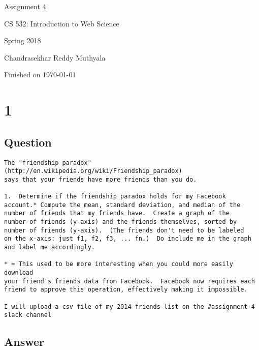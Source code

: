 \documentclass[letterpaper,11pt]{article}
\begin{document}
\begin{titlepage}

\begin{center}

\Huge{Assignment 4}

\Large{CS 532:  Introduction to Web Science}

\Large{Spring 2018}

\Large{Chandrasekhar Reddy Muthyala}

\Large Finished on \today

\end{center}

\end{titlepage}

\newpage


\section*{1}


\subsection*{Question}


\begin{justify}
\begin{verbatim}
The "friendship paradox" (http://en.wikipedia.org/wiki/Friendship_paradox)
says that your friends have more friends than you do.  

1.  Determine if the friendship paradox holds for my Facebook
account.* Compute the mean, standard deviation, and median of the
number of friends that my friends have.  Create a graph of the
number of friends (y-axis) and the friends themselves, sorted by
number of friends (y-axis).  (The friends don't need to be labeled
on the x-axis: just f1, f2, f3, ... fn.)  Do include me in the graph
and label me accordingly.

* = This used to be more interesting when you could more easily download
your friend's friends data from Facebook.  Facebook now requires each
friend to approve this operation, effectively making it impossible.

I will upload a csv file of my 2014 friends list on the #assignment-4 slack channel
\end{verbatim}
\end{justify}

\clearpage
\subsection*{Answer}
\end{document}

